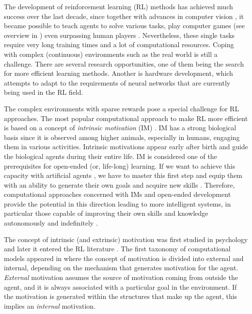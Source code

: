 \documentclass[a4paper,11pt]{elsarticle}
\begin{document}
The development of reinforcement learning (RL) methods has achieved much success over the last decade, since together with advances in computer vision  \citep{krizhevsky2012imagenet,he2016deep}, it became possible to teach agents to solve various tasks, play computer games \citep{mnih2013playing} (see overview in \citep{RLgames2023}) even surpassing human players \citep{mnih2015humanlevel}.
Nevertheless, these single tasks require very long training times and a lot of computational resources.
Coping with complex (continuous) environments such as the real world is still a challenge. There are several research opportunities, one of them being the search for more efficient learning methods.
Another is hardware development, which attempts to adapt to the requirements of neural networks that are currently being used in the RL field.

The complex environments with sparse rewards pose a special challenge for RL approaches.
The most popular computational approach to make RL more efficient is based on a concept of {\it intrinsic motivation} (IM) \citep{baldassarre2014intrinsic}. 
IM has a strong biological basis  \citep{Ryan00,Morris2022} since it is observed among higher animals, especially in humans, engaging them in various activities. 
Intrinsic motivations appear early after birth and guide the biological agents during their entire life. IM is considered one of the prerequisites for open-ended (or, life-long) learning. 
If we want to achieve this capacity with artificial agents \citep{Parisi2019}, we have to master this first step and equip them with an ability to generate their own goals and acquire new skills \cite{Holas2021}. 
Therefore, computational approaches concerned with IMs and open-ended development provide the potential in this direction leading to more intelligent systems, in particular those capable of improving their own skills and knowledge autonomously and indefinitely \citep{baldassarre2014intrinsic,Baldassarre19}.

The concept of intrinsic (and extrinsic) motivation was first studied in psychology \citep{Ryan00} and later it entered the RL literature \citep{barto2005intrinsic, singh2010intrinsically, Barto2013}. The first taxonomy of computational models appeared in \cite{oudeyer2009intrinsic} where the concept of motivation is divided into external and internal, depending on the mechanism that generates motivation for the agent. \textit{External} motivation assumes the source of motivation coming from outside the agent, and it is always associated with a particular goal in the environment. If the motivation is generated within the structures that make up the agent, this implies an \textit{internal} motivation. 
\end{document}
